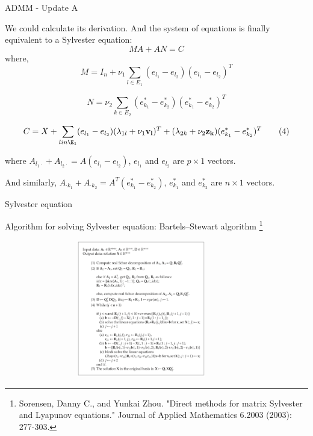 \documentclass{beamer}
\begin{document}
\begin{frame}{ADMM - Update A}

We could calculate its derivation. And the system of equations is finally equivalent to a Sylvester equation:
\begin{equation}
    MA + AN = C \tag{1}
\end{equation}
where, 
\begin{equation}
    M = I_n + \nu_1 \sum_{l \in E_1}(e_{l_1} - e_{l_2})(e_{l_1} - e_{l_2})^T \tag{2}
\end{equation}

\begin{equation}
    N = \nu_2 \sum_{k \in E_2}(e^{*}_{k_1} - e^{*}_{k_2})(e^{*}_{k_1} - e^{*}_{k_2})^T \tag{3}
\end{equation}

\begin{equation}
    C = X + \sum_{l in \E_1} (e_{l_1} - e_{l_2})(\lambda_{1l} + \nu_1 \mathbf{v_l})^T    + (\lambda_{2k} + \nu_2 \mathbf{z_k}) (e^{*}_{k_1} - e^{*}_{k_2})^T \tag{4}
\end{equation}

where $A_{l_1 \cdot} + A_{l_2 \cdot} = A(e_{l_1} - e_{l_2})$, $e_{l_1}$ and $e_{l_2}$ are $p \times 1$ vectors. 

And similarly, $A_{\cdot k_1 } + A_{\cdot k_2} = A^T(e^{*}_{k_1} - e^{*}_{k_2})$, $e^{*}_{k_1}$ and $e^{*}_{k_2}$ are $n \times 1$ vectors.

\end{frame}

\begin{frame}{Sylvester equation}
  
    Algorithm for solving Sylvester equation: 
     Bartels–Stewart algorithm
     \footnote{Sorensen, Danny C., and Yunkai Zhou. "Direct methods for matrix Sylvester and Lyapunov equations." Journal of Applied Mathematics 6.2003 (2003): 277-303.}
    
    \centering
    \includegraphics[width=12cm,height=6cm,keepaspectratio]{eq}
    
\end{frame}
\end{document}
